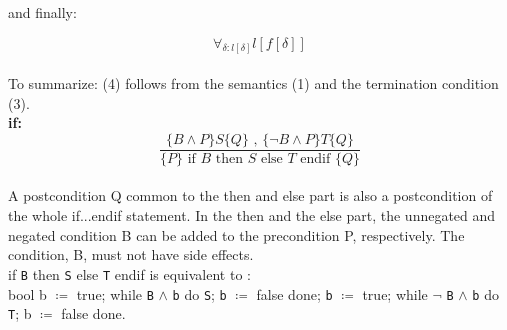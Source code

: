 \documentclass[a4paper]{article}
\begin{document}
	and finally:
	
	\begin{equation}
	\forall_{\delta \colon l[\delta]} l[f[\delta]]
	\end{equation} \\
	
	To summarize: (4) follows from the semantics (1) and the termination condition (3). \\
	
	\textbf{if:} \\
	
	\[\frac{\{B \wedge P\} S\{Q\} \text{ , } \{\neg B \wedge P\} T\{Q\}}{\{P\} \text{ if } B \text{ then } S \text{ else } T \text{ endif } \{Q\}}\] \\
	
	A postcondition Q common to the then and else part is also a postcondition of the whole if...endif statement. In the then and the else part, the unnegated and negated condition B can be added to the precondition P, respectively. The condition, B, must not have side effects. \\
	
	if \texttt{B} then \texttt{S} else \texttt{T} endif is equivalent to :\\
	
	bool b $\coloneqq$ true; while \texttt{B} $\wedge$ \texttt{b}  do \texttt{S}; \texttt{b} $\coloneqq$ false done; \texttt{b} $\coloneqq$ true; while $\neg$ \texttt{B} $\wedge$ \texttt{b} do \texttt{T}; b $\coloneqq$ false done.
	
	
	 
\end{document}

